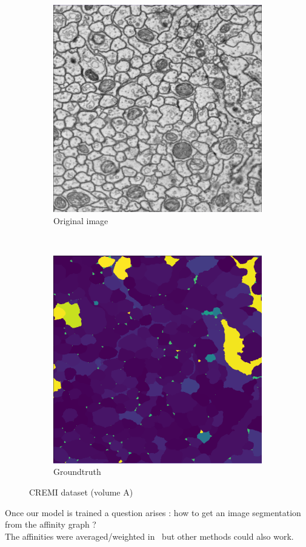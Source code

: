 \begin{figure}[!htbp]
    \centering
    \begin{subfigure}[t]{0.45\textwidth}
        \centering
        \includegraphics[height=0.6\textwidth]{./images/cremi_orig_1.png}
        \caption{Original image}
    \end{subfigure}%
    ~ 
    \begin{subfigure}[t]{0.45\textwidth}
        \centering
        \includegraphics[height=0.6\textwidth]{./images/cremi_gt_1.png}
        \caption{Groundtruth}
    \end{subfigure}
    \caption{CREMI dataset (volume A)}
	\label{fig:cremi_example}
\end{figure}

Once our model is trained a question arises : how to get an image segmentation from the affinity graph ?\\
The affinities were averaged/weighted in~\cite{turaga_maximin_2009} but other
methods could also work.\\


